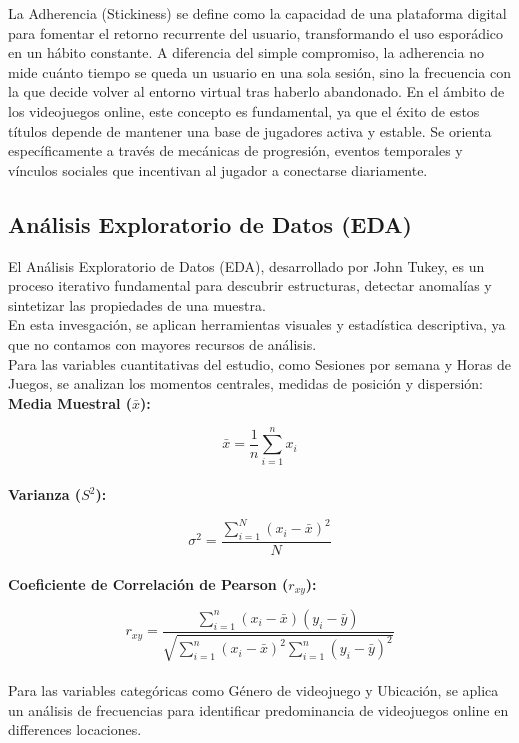 \documentclass[oneside,11pt]{Latex/Classes/PhDthesisPSnPDF}
\begin{document}
La Adherencia (Stickiness) se define como la capacidad de una plataforma
digital para fomentar el retorno recurrente del usuario, transformando
el uso esporádico en un hábito constante. A diferencia del simple
compromiso, la adherencia no mide cuánto tiempo se queda un usuario en
una sola sesión, sino la frecuencia con la que decide volver al entorno
virtual tras haberlo abandonado. En el ámbito de los videojuegos online,
este concepto es fundamental, ya que el éxito de estos títulos depende
de mantener una base de jugadores activa y estable. Se orienta
específicamente a través de mecánicas de progresión, eventos temporales
y vínculos sociales que incentivan al jugador a conectarse diariamente.

\subsection{Análisis Exploratorio de Datos (EDA)}

El Análisis Exploratorio de Datos (EDA), desarrollado por John Tukey, es
un proceso iterativo fundamental para descubrir estructuras, detectar
anomalías y sintetizar las propiedades de una muestra.\\

En esta invesgación, se aplican herramientas visuales y estadística
descriptiva, ya que no contamos con mayores recursos de análisis.\\

Para las variables cuantitativas del estudio, como Sesiones por semana y
Horas de Juegos, se analizan los momentos centrales, medidas de posición
y dispersión:\\

\textbf{Media Muestral (\(\bar{x}\)):}

\[\bar{x} = \frac{1}{n} \sum_{i=1}^{n} x_i\]\\

\textbf{Varianza (\(S^2\)):}

\[\sigma^2 = \frac{\sum_{i=1}^{N} (x_{i} - \bar{x})^2}{N}\]\\

\textbf{Coeficiente de Correlación de Pearson (\(r_{xy}\)):}

\[r_{xy} = \frac{\sum_{i=1}^{n} (x_i - \bar{x})(y_i - \bar{y})}{\sqrt{\sum_{i=1}^{n} (x_i - \bar{x})^2 \sum_{i=1}^{n} (y_i - \bar{y})^2}}\]\\

Para las variables categóricas como Género de videojuego y Ubicación, se
aplica un análisis de frecuencias para identificar predominancia de
videojuegos online en differences locaciones.
\end{document}
